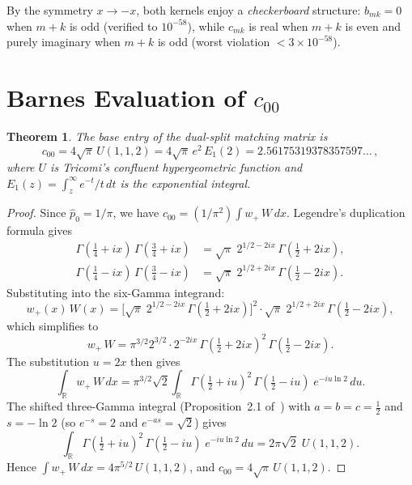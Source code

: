 \documentclass[11pt,a4paper]{article}
\newtheorem{theorem}[proposition]{Theorem}
\newcommand{\R}{\mathbb{R}}
\begin{document}
By the symmetry $x \to -x$, both kernels enjoy a
\emph{checkerboard} structure:
$b_{mk} = 0$ when $m+k$ is odd (verified to $10^{-58}$),
while $c_{mk}$ is real when $m+k$ is even and purely imaginary
when $m+k$ is odd (worst violation $< 3 \times 10^{-58}$).

\section{Barnes Evaluation of $c_{00}$}

\begin{theorem}\label{thm:c00}
The base entry of the dual-split matching matrix is
\begin{equation}\label{eq:c00}
  c_{00} = 4\sqrt{\pi}\, U(1, 1, 2)
         = 4\sqrt{\pi}\, e^2\, E_1(2)
         = 2.56175319378357597\ldots\,,
\end{equation}
where $U$ is Tricomi's confluent hypergeometric function and
$E_1(z) = \int_z^\infty e^{-t}/t\,dt$ is the exponential integral.
\end{theorem}

\begin{proof}
Since $\widehat{p}_0 = 1/\pi$, we have
$c_{00} = (1/\pi^2)\int w_+\,W\,dx$.
Legendre's duplication formula gives
\begin{align}
  \Gamma(\tfrac14+ix)\,\Gamma(\tfrac34+ix)
  &= \sqrt{\pi}\; 2^{1/2 - 2ix}\, \Gamma(\tfrac12+2ix), \label{eq:dup1}\\
  \Gamma(\tfrac14-ix)\,\Gamma(\tfrac34-ix)
  &= \sqrt{\pi}\; 2^{1/2 + 2ix}\, \Gamma(\tfrac12-2ix). \label{eq:dup2}
\end{align}
Substituting into the six-Gamma integrand:
\[
  w_+(x)\,W(x)
  = \bigl[\sqrt\pi\; 2^{1/2-2ix}\,\Gamma(\tfrac12{+}2ix)\bigr]^2
    \cdot \sqrt\pi\; 2^{1/2+2ix}\,\Gamma(\tfrac12{-}2ix),
\]
which simplifies to
\[
  w_+\,W = \pi^{3/2} 2^{3/2} \cdot 2^{-2ix}\,
    \Gamma(\tfrac12{+}2ix)^2\,\Gamma(\tfrac12{-}2ix).
\]
The substitution $u = 2x$ then gives
\[
  \int_\R w_+\,W\,dx
  = \pi^{3/2}\sqrt{2} \int_\R
    \Gamma(\tfrac12+iu)^2\,\Gamma(\tfrac12-iu)\;
    e^{-iu\ln 2}\, du.
\]
The shifted three-Gamma integral (Proposition~2.1
of~\cite{MP}) with $a = b = c = \tfrac12$ and $s = -\ln 2$
(so $e^{-s} = 2$ and $e^{-as} = \sqrt{2}$) gives
\[
  \int_\R
  \Gamma(\tfrac12+iu)^2\,\Gamma(\tfrac12-iu)\;
  e^{-iu\ln 2}\, du
  = 2\pi\sqrt{2}\; U(1, 1, 2).
\]
Hence $\int w_+\,W\,dx = 4\pi^{5/2}\,U(1,1,2)$, and
$c_{00} = 4\sqrt{\pi}\,U(1,1,2)$.
\end{proof}
\end{document}
